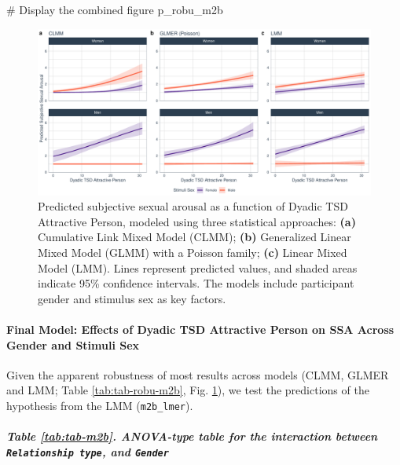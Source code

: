 \documentclass[
  bookmarksnumbered]{article}
\newenvironment{Shaded}{\begin{snugshade}}{\end{snugshade}}
\newcommand{\CommentTok}[1]{\textcolor[rgb]{0.50,0.62,0.50}{#1}}
\newcommand{\NormalTok}[1]{\textcolor[rgb]{0.80,0.80,0.80}{#1}}
\begin{document}
\begin{Shaded}
\begin{Highlighting}[]
\CommentTok{\# Display the combined figure}
\NormalTok{p\_robu\_m2b}
\end{Highlighting}
\end{Shaded}

\begin{figure}
\centering
\includegraphics{Sexual_Desire_Arousal_anonymous_files/figure-latex/preds-m2b-1.pdf}
\caption{\label{fig:preds-m2b}Predicted subjective sexual arousal as a function of Dyadic TSD Attractive Person, modeled using three statistical approaches: \textbf{(a)} Cumulative Link Mixed Model (CLMM); \textbf{(b)} Generalized Linear Mixed Model (GLMM) with a Poisson family; \textbf{(c)} Linear Mixed Model (LMM). Lines represent predicted values, and shaded areas indicate 95\% confidence intervals. The models include participant gender and stimulus sex as key factors.}
\end{figure}

\paragraph{Final Model: Effects of Dyadic TSD Attractive Person on SSA Across Gender and Stimuli Sex}\label{final-model-effects-of-dyadic-tsd-attractive-person-on-ssa-across-gender-and-stimuli-sex}

Given the apparent robustness of most results across models (CLMM, GLMER and LMM; Table \ref{tab:tab-robu-m2b}, Fig. \ref{fig:preds-m2b}), we test the predictions of the hypothesis from the LMM (\texttt{m2b\_lmer}).

\subparagraph{\texorpdfstring{Table \ref{tab:tab-m2b}. ANOVA-type table for the interaction between \texttt{Relationship\ type}, and \texttt{Gender}}{Table \ref{tab:tab-m2b}. ANOVA-type table for the interaction between Relationship type, and Gender}}\label{table-reftabtab-m2b.-anova-type-table-for-the-interaction-between-relationship-type-and-gender}
\end{document}
